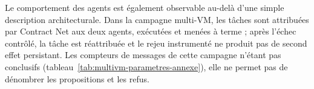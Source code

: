 
Le comportement des agents est également observable au-delà d'une simple description architecturale. Dans la campagne multi-VM, les tâches sont attribuées par Contract Net aux deux agents, exécutées et menées à terme ; après l'échec contrôlé, la tâche est réattribuée et le rejeu instrumenté ne produit pas de second effet persistant. Les compteurs de messages de cette campagne n'étant pas conclusifs (tableau~\ref{tab:multivm-parametres-annexe}), elle ne permet pas de dénombrer les propositions et les refus.

